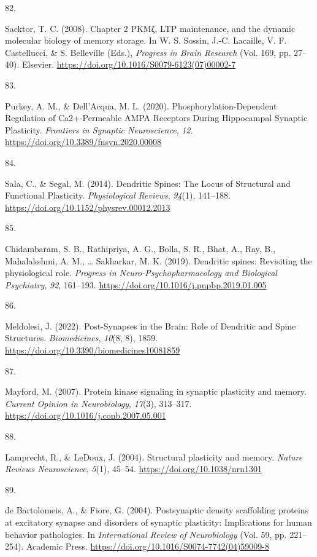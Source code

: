 \documentclass[
  11pt,
  letterpaper,
]{scrreprt}
\newlength{\cslhangindent}
\newlength{\csllabelwidth}
\newenvironment{CSLReferences}[2] %
 {\begin{list}{}{%
  \setlength{\itemindent}{0pt}
  \setlength{\leftmargin}{0pt}
  \setlength{\parsep}{0pt}
  \ifodd #1
   \setlength{\leftmargin}{\cslhangindent}
   \setlength{\itemindent}{-1\cslhangindent}
  \fi
  \setlength{\itemsep}{#2\baselineskip}}}
 {\end{list}}
\newcommand{\CSLLeftMargin}[1]{\parbox[t]{\csllabelwidth}{\strut#1\strut}}
\newcommand{\CSLRightInline}[1]{\parbox[t]{\linewidth - \csllabelwidth}{\strut#1\strut}}
\begin{document}
\begin{CSLReferences}{0}{0}
\CSLLeftMargin{82. }%
\CSLRightInline{Sacktor, T. C. (2008). Chapter 2 {PKMζ}, {LTP}
maintenance, and the dynamic molecular biology of memory storage. In W.
S. Sossin, J.-C. Lacaille, V. F. Castellucci, \& S. Belleville (Eds.),
\emph{Progress in {Brain Research}} (Vol. 169, pp. 27--40). Elsevier.
\url{https://doi.org/10.1016/S0079-6123(07)00002-7}}

\CSLLeftMargin{83. }%
\CSLRightInline{Purkey, A. M., \& Dell'Acqua, M. L. (2020).
Phosphorylation-{Dependent Regulation} of {Ca2}+-{Permeable AMPA
Receptors During Hippocampal Synaptic Plasticity}. \emph{Frontiers in
Synaptic Neuroscience}, \emph{12}.
\url{https://doi.org/10.3389/fnsyn.2020.00008}}

\CSLLeftMargin{84. }%
\CSLRightInline{Sala, C., \& Segal, M. (2014). Dendritic {Spines}: {The
Locus} of {Structural} and {Functional Plasticity}. \emph{Physiological
Reviews}, \emph{94}(1), 141--188.
\url{https://doi.org/10.1152/physrev.00012.2013}}

\CSLLeftMargin{85. }%
\CSLRightInline{Chidambaram, S. B., Rathipriya, A. G., Bolla, S. R.,
Bhat, A., Ray, B., Mahalakshmi, A. M., \ldots{} Sakharkar, M. K. (2019).
Dendritic spines: {Revisiting} the physiological role. \emph{Progress in
Neuro-Psychopharmacology and Biological Psychiatry}, \emph{92},
161--193. \url{https://doi.org/10.1016/j.pnpbp.2019.01.005}}

\CSLLeftMargin{86. }%
\CSLRightInline{Meldolesi, J. (2022). Post-{Synapses} in the {Brain}:
{Role} of {Dendritic} and {Spine Structures}. \emph{Biomedicines},
\emph{10}(8, 8), 1859.
\url{https://doi.org/10.3390/biomedicines10081859}}

\CSLLeftMargin{87. }%
\CSLRightInline{Mayford, M. (2007). Protein kinase signaling in synaptic
plasticity and memory. \emph{Current Opinion in Neurobiology},
\emph{17}(3), 313--317.
\url{https://doi.org/10.1016/j.conb.2007.05.001}}

\CSLLeftMargin{88. }%
\CSLRightInline{Lamprecht, R., \& LeDoux, J. (2004). Structural
plasticity and memory. \emph{Nature Reviews Neuroscience}, \emph{5}(1),
45--54. \url{https://doi.org/10.1038/nrn1301}}

\CSLLeftMargin{89. }%
\CSLRightInline{de Bartolomeis, A., \& Fiore, G. (2004). Postsynaptic
density scaffolding proteins at excitatory synapse and disorders of
synaptic plasticity: Implications for human behavior pathologies. In
\emph{International {Review} of {Neurobiology}} (Vol. 59, pp. 221--254).
Academic Press. \url{https://doi.org/10.1016/S0074-7742(04)59009-8}}


\end{CSLReferences}
\end{document}
